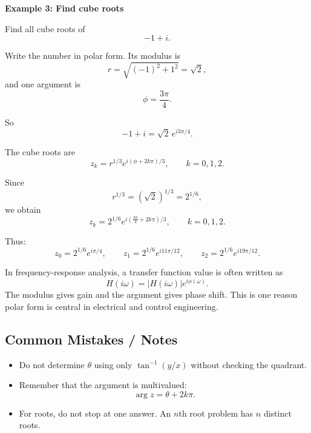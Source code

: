 \begin{examplebox}
    \textbf{Example 3: Find cube roots}

    Find all cube roots of
    \[
        -1+i.
    \]

    Write the number in polar form. Its modulus is
    \[
        r=\sqrt{(-1)^2+1^2}=\sqrt{2},
    \]
    and one argument is
    \[
        \phi=\frac{3\pi}{4}.
    \]

    So
    \[
        -1+i=\sqrt{2}\,e^{i3\pi/4}.
    \]

    The cube roots are
    \[
        z_k = r^{1/3} e^{i(\phi+2k\pi)/3},
        \qquad k=0,1,2.
    \]

    Since
    \[
        r^{1/3}=(\sqrt{2})^{1/3}=2^{1/6},
    \]
    we obtain
    \[
        z_k = 2^{1/6} e^{i\left(\frac{3\pi}{4}+2k\pi\right)/3},
        \qquad k=0,1,2.
    \]

    Thus:
    \[
        z_0=2^{1/6}e^{i\pi/4},
        \qquad
        z_1=2^{1/6}e^{i11\pi/12},
        \qquad
        z_2=2^{1/6}e^{i19\pi/12}.
    \]
\end{examplebox}

\begin{noteBox}
    In frequency-response analysis, a transfer function value is often written as
    \[
        H(i\omega)=|H(i\omega)|e^{i\phi(\omega)}.
    \]
    The modulus gives gain and the argument gives phase shift. This is one reason polar form is central in electrical and control engineering.
\end{noteBox}

\subsection*{Common Mistakes / Notes}

\begin{itemize}
    \item Do not determine $\theta$ using only $\tan^{-1}(y/x)$ without checking the quadrant.
    \item Remember that the argument is multivalued:
          \[
              \arg z = \theta + 2k\pi.
          \]
    \item For roots, do not stop at one answer. An $n$th root problem has $n$ distinct roots.
\end{itemize}